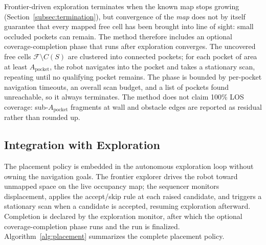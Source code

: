 Frontier-driven exploration terminates when the known map stops growing
(Section~\ref{subsec:termination}), but convergence of the \emph{map} does not
by itself guarantee that every mapped free cell has been brought into line of
sight: small occluded pockets can remain. The method therefore includes an
optional coverage-completion phase that runs after exploration converges. The
uncovered free cells $\mathcal{F}\setminus C(S)$ are clustered into connected
pockets; for each pocket of area at least $A_{\mathrm{pocket}}$, the robot
navigates into the pocket and takes a stationary scan, repeating until no
qualifying pocket remains. The phase is bounded by per-pocket navigation
timeouts, an overall scan budget, and a list of pockets found unreachable, so
it always terminates. The method does not claim 100\% LOS coverage:
sub-$A_{\mathrm{pocket}}$ fragments at wall and obstacle edges are reported as
residual rather than rounded up.

\subsection{Integration with Exploration}
\label{subsec:integration}

The placement policy is embedded in the autonomous exploration loop without
owning the navigation goals. The frontier explorer drives the robot toward
unmapped space on the live occupancy map; the sequencer monitors displacement,
applies the accept/skip rule at each raised candidate, and triggers a stationary
scan when a candidate is accepted, resuming exploration afterward. Completion
is declared by the exploration monitor, after which the optional
coverage-completion phase runs and the run is finalized.
Algorithm~\ref{alg:placement} summarizes the complete placement policy.

